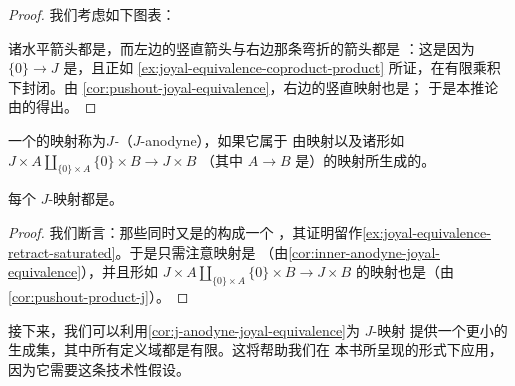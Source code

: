 \begin{proof}
我们考虑如下图表：
\begin{center}
\end{center}
诸水平箭头都是\trMonomorphism{}，而左边的竖直箭头与右边那条弯折的箭头都是%
\trJoyalEquivalence{}：这是因为 $\{0\} \to J$ 是\trJoyalEquivalence{}，且正如%
\cref{ex:joyal-equivalence-coproduct-product} 所证，\trJoyalEquivalence{}在有限乘积下封闭。由%
\cref{cor:pushout-joyal-equivalence}，右边的竖直映射也是\trJoyalEquivalence{}；
于是本推论由\trJoyalEquivalence{}的\trThreeForTwoProperty{}得出。
\end{proof}

\begin{definition}\label{def:j-anodyne}
一个\trSimplicialSets{}的映射称为\emph{$J$-\trAnodyne{}}（$J$-anodyne），如果它属于
由\trInnerAnodyne{}映射以及诸形如
$J \times A \amalg_{\{0\} \times A} \{0\} \times B \longrightarrow J \times B$
（其中 $A \to B$ 是\trMonomorphism{}）的映射所生成的\trSaturatedSet{}。
\end{definition}

\begin{corollary}\label{cor:j-anodyne-joyal-equivalence}
每个 $J$-\trAnodyne{}映射都是\trJoyalEquivalence{}。
\end{corollary}

\begin{proof}
我们断言：那些同时又是\trJoyalEquivalence{}的\trMonomorphism{}构成一个%
\trSaturatedSet{}，其证明留作\cref{ex:joyal-equivalence-retract-saturated}。于是只需注意\trInnerAnodyne{}映射是%
\trJoyalEquivalence{}（由\cref{cor:inner-anodyne-joyal-equivalence}），并且形如
$J \times A \amalg_{\{0\} \times A} \{0\} \times B \longrightarrow J \times B$
的映射也是\trJoyalEquivalence{}（由\cref{cor:pushout-product-j}）。
\end{proof}

接下来，我们可以利用\cref{cor:j-anodyne-joyal-equivalence}为 $J$-\trAnodyne{}映射
提供一个更小的生成集，其中所有定义域都是有限\trSimplicialSets{}。这将帮助我们在
本书所呈现的形式下应用\trSmallObjectArgument{}，因为它需要这条技术性假设。

